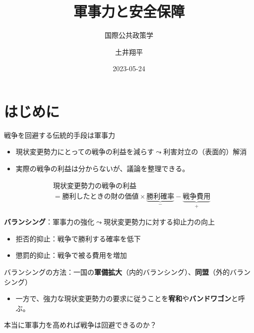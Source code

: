 \documentclass[
  xelatex,
  ja=standard]{bxjsarticle}
\title{軍事力と安全保障}
\subtitle{国際公共政策学}
\author{土井翔平}
\date{2023-05-24}
\providecommand{\tightlist}{%
  \setlength{\itemsep}{0pt}\setlength{\parskip}{0pt}}\usepackage{longtable,booktabs,array}
\begin{document}
\maketitle
\ifdefined\Shaded\renewenvironment{Shaded}{\begin{tcolorbox}[interior hidden, sharp corners, boxrule=0pt, frame hidden, breakable, enhanced, borderline west={3pt}{0pt}{shadecolor}]}{\end{tcolorbox}}\fi

\hypertarget{ux306fux3058ux3081ux306b}{%
\section*{はじめに}\label{ux306fux3058ux3081ux306b}}

戦争を回避する伝統的手段は軍事力

\begin{itemize}
\tightlist
\item
  現状変更勢力にとっての戦争の利益を減らす\(\leadsto\)利害対立の（表面的）解消
\item
  実際の戦争の利益は分からないが、議論を整理できる。
\end{itemize}

\[
\begin{split}
&\textrm{現状変更勢力の戦争の利益} \\
&= \textrm{勝利したときの財の価値} \times \underbrace{\textrm{勝利確率}}_{-} - \underbrace{\textrm{戦争費用}}_{+}
\end{split}
\]

\textbf{バランシング}：軍事力の強化\(\leadsto\)現状変更勢力に対する抑止力の向上

\begin{itemize}
\tightlist
\item
  拒否的抑止：戦争で勝利する確率を低下
\item
  懲罰的抑止：戦争で被る費用を増加
\end{itemize}

バランシングの方法：一国の\textbf{軍備拡大}（内的バランシング）、\textbf{同盟}（外的バランシング）

\begin{itemize}
\tightlist
\item
  一方で、強力な現状変更勢力の要求に従うことを\textbf{宥和}や\textbf{バンドワゴン}と呼ぶ\citep{schweller1994}。
\end{itemize}

本当に軍事力を高めれば戦争は回避できるのか？
\end{document}
